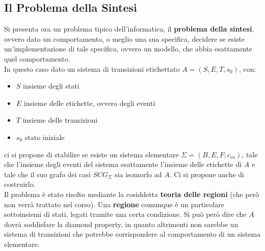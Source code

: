\documentclass[a4paper,12pt, oneside]{book}
\begin{document}
\subsection{Il Problema della Sintesi}
Si presenta ora un problema tipico dell'informatica, il \textbf{problema della
  sintesi}, ovvero dato un comportamento, o meglio una sua specifica, decidere
se esiste un'implementazione di tale specifica, ovvero un modello, che abbia
esattamente quel comportamento.\\
In questo caso dato un sistema di transizioni etichettato $A=(S,E,T,s_0)$, con:
\begin{itemize}
  \item $S$ insieme degli stati
  \item $E$ insieme delle etichette, ovvero degli eventi
  \item $T$ insieme delle transizioni
  \item $s_0$ stato iniziale
\end{itemize}
ci si propone di stabilire se esiste un sistema elementare
$\Sigma=(B,E,F;c_{in})$, tale che l'insieme degli eventi del sistema esattamente
l'insieme delle etichette di $A$ e tale che il suo grafo dei casi $SCG_\Sigma$
sia isomorfo ad $A$. Ci si propone anche di costruirlo.\\
Il problema è stato risolto mediante la cosiddetta \textbf{teoria delle regioni}
(che però non verrà trattato nel corso). Una \textbf{regione} comunque è un
  particolare sottoinsiemi di stati, legati tramite una certa condizione. Si può
  però dire che $A$ dovrà 
soddisfare la diamond property, in quanto altrimenti non sarebbe un sistema di
transizioni che potrebbe corrispondere al comportamento di un sistema
elementare.
\end{document}
